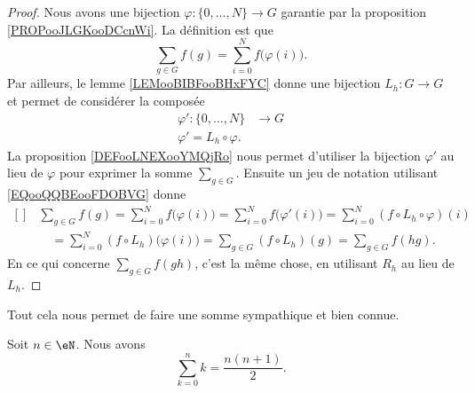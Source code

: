 \begin{proof}
    Nous avons une bijection \( \varphi\colon \{ 0,\ldots,  N \}\to G\) garantie par la proposition \ref{PROPooJLGKooDCcnWi}. La définition est que
    \begin{equation}
        \sum_{g\in G}f(g)=\sum_{i=0}^Nf\big( \varphi(i) \big).
    \end{equation}
    Par ailleurs, le lemme \ref{LEMooBIBFooBHxFYC} donne une bijection \( L_h\colon G\to G\) et permet de considérer la composée
    \begin{equation}
        \begin{aligned}
            \varphi'\colon \{ 0,\ldots,  N \}&\to G \\
            \varphi'=L_h\circ \varphi.
        \end{aligned}
    \end{equation}
    La proposition \ref{DEFooLNEXooYMQjRo} nous permet d'utiliser la bijection \( \varphi'\) au lieu de \( \varphi\) pour exprimer la somme \( \sum_{g\in G}\). Ensuite un jeu de notation utilisant \eqref{EQooQQBEooFDOBVG} donne
    \begin{equation}
        \begin{aligned}[]
            &\sum_{g\in G}f(g)=\sum_{i=0}^Nf\big( \varphi(i) \big)=\sum_{i=0}^Nf\big( \varphi'(i) \big)=\sum_{i=0}^N(f\circ L_h\circ \varphi)(i)\\
            &\quad=\sum_{i=0}^N(f\circ L_h)\big( \varphi(i) \big)=\sum_{g\in G}(f\circ L_h)(g)=\sum_{g\in G}f(hg).
        \end{aligned}
    \end{equation}
    En ce qui concerne \( \sum_{g\in G}f(gh)\), c'est la même chose, en utilisant \( R_h\) au lieu de \( L_h\).
\end{proof}

Tout cela nous permet de faire une somme sympathique et bien connue.
\begin{lemma}
    Soit \( n\in \eN\). Nous avons
    \begin{equation}
        \sum_{k=0}^nk=\frac{ n(n+1) }{ 2 }.
    \end{equation}
\end{lemma}

